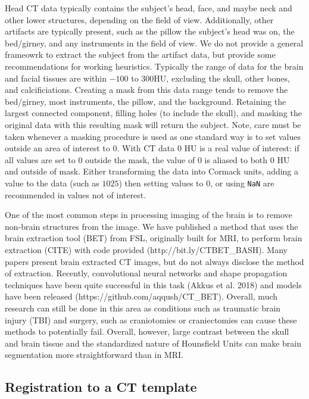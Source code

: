 \documentclass[]{elsarticle} %
\begin{document}
Head CT data typically contains the subject's head, face, and maybe neck
and other lower structures, depending on the field of view.
Additionally, other artifacts are typically present, such as the pillow
the subject's head was on, the bed/girney, and any instruments in the
field of view. We do not provide a general frameowrk to extract the
subject from the artifact data, but provide some recommendations for
working heuristics. Typically the range of data for the brain and facial
tissues are within \(-100\) to \(300\)HU, excluding the skull, other
bones, and calcificiations. Creating a mask from this data range tends
to remove the bed/girney, most instruments, the pillow, and the
background. Retaining the largest connected component, filling holes (to
include the skull), and masking the original data with this resulting
mask will return the subject. Note, care must be taken whenever a
masking procedure is used as one standard way is to set values outside
an area of interest to \(0\). With CT data \(0\) HU is a real value of
interest: if all values are set to \(0\) outside the mask, the value of
\(0\) is aliased to both \(0\) HU and outside of mask. Either
transforming the data into Cormack units, adding a value to the data
(such as \(1025\)) then setting values to \(0\), or using \texttt{NaN}
are recommended in values not of interest.

One of the most common steps in processing imaging of the brain is to
remove non-brain structures from the image. We have published a method
that uses the brain extraction tool (BET) from FSL, originally built for
MRI, to perform brain extraction (CITE) with code provided
(http://bit.ly/CTBET\_BASH). Many papers present brain extracted CT
images, but do not always disclose the method of extraction. Recently,
convolutional neural networks and shape propagation techniques have been
quite successful in this task (Akkus et al. 2018) and models have been
released (https://github.com/aqqush/CT\_BET). Overall, much research can
still be done in this area as conditions such as traumatic brain injury
(TBI) and surgery, such as craniotomies or craniectomies can cause these
methods to potentially fail. Overall, however, large contrast between
the skull and brain tissue and the standardized nature of Hounsfield
Units can make brain segmentation more straightforward than in MRI.

\hypertarget{registration-to-a-ct-template}{%
\subsection{Registration to a CT
template}\label{registration-to-a-ct-template}}
\end{document}
